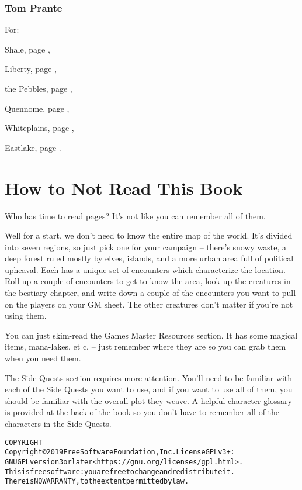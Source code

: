 \begin{multicols}{2}
\subsubsection{Tom Prante}

For:

Shale, page \pageref{tom:autumn},

Liberty, page \pageref{tom:swamp},

the Pebbles, page \pageref{tom:pebbles},

Quennome, page \pageref{tom:quen},

Whiteplains, page \pageref{tom:whiteplains},

Eastlake, page \pageref{tom:winter}.

\end{multicols}

\section*{How to Not Read This Book}

\begin{multicols}{2}

\noindent Who has time to read \pageref{lastpage} pages?  It's not like you can remember all of them.

Well for a start, we don't need to know the entire map of the world.
It's divided into seven regions, so just pick one for your campaign -- there's snowy waste, a deep forest ruled mostly by elves, islands, and a more urban area full of political upheaval.
Each has a unique set of encounters which characterize the location.
Roll up a couple of encounters to get to know the area, look up the creatures in the bestiary chapter, and write down a couple of the encounters you want to pull on the players on your GM sheet.
The other creatures don't matter if you're not using them.

You can just skim-read the Games Master Resources section.
It has some magical items, mana-lakes, et c. -- just remember where they are so you can grab them when you need them.

The Side Quests section requires more attention.
You'll need to be familiar with each of the Side Quests you want to use, and if you want to use all of them, you should be familiar with the overall plot they weave.
A helpful character glossary is provided at the back of the book so you don't have to remember all of the characters in the Side Quests.

\end{multicols}

\begin{alltt}
COPYRIGHT
       Copyright \copyright 2019 Free Software Foundation, Inc.  License GPLv3+:
	GNU GPL version 3 or later <https://gnu.org/licenses/gpl.html>.
       This is free software: you are free to change and redistribute it.
	There is NO WARRANTY, to the extent permitted by law.

\end{alltt}
